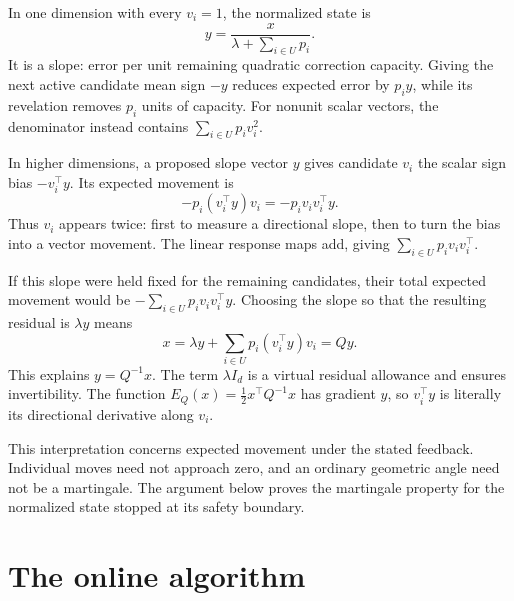 \documentclass[11pt,a4paper]{article}
\numberwithin{equation}{section}
\theoremstyle{remark}
\begin{document}
In one dimension with every $v_i=1$, the normalized state is
\[
 y=\frac{x}{\lambda+\sum_{i\in U}p_i}.
\]
It is a slope: error per unit remaining quadratic correction capacity.
Giving the next active candidate mean sign $-y$ reduces expected error
by $p_i y$, while its revelation removes $p_i$ units of capacity.
For nonunit scalar vectors, the denominator instead contains
$\sum_{i\in U}p_i v_i^2$.

In higher dimensions, a proposed slope vector $y$ gives candidate $v_i$
the scalar sign bias $-v_i^\top y$. Its expected movement is
\begin{equation}\label{eq:response}
 -p_i(v_i^\top y)v_i=-p_i v_iv_i^\top y.
\end{equation}
Thus $v_i$ appears twice: first to measure a directional slope, then to
turn the bias into a vector movement. The linear response maps add,
giving $\sum_{i\in U}p_i v_iv_i^\top$.

If this slope were held fixed for the remaining candidates, their total
expected movement would be $-\sum_{i\in U}p_i v_iv_i^\top y$. Choosing
the slope so that the resulting residual is $\lambda y$ means
\begin{equation}\label{eq:response-balance}
 x=\lambda y+\sum_{i\in U}p_i(v_i^\top y)v_i=Qy.
\end{equation}
This explains $y=Q^{-1}x$. The term $\lambda I_d$ is a virtual residual
allowance and ensures invertibility. The function
$E_Q(x)=\frac12x^\top Q^{-1}x$ has gradient $y$, so $v_i^\top y$ is
literally its directional derivative along $v_i$.

This interpretation concerns expected movement under the stated
feedback. Individual moves need not approach zero, and an ordinary
geometric angle need not be a martingale. The argument below proves the
martingale property for the normalized state stopped at its safety boundary.

\section{The online algorithm}
\label{sec:algorithm}
\end{document}

